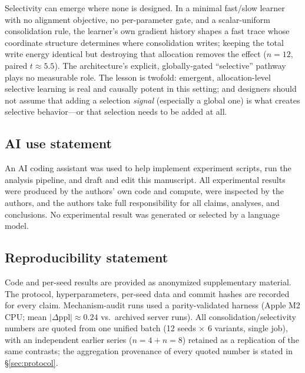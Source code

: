 \documentclass{article} %
\begin{document}
Selectivity can emerge where none is designed. In a minimal fast/slow learner with no alignment objective, no per-parameter gate, and a scalar-uniform consolidation rule, the learner's own gradient history shapes a fast trace whose coordinate structure determines where consolidation writes; keeping the total write energy identical but destroying that allocation removes the effect ($n{=}12$, paired $t\approx5.5$). The architecture's explicit, globally-gated ``selective'' pathway plays no measurable role. The lesson is twofold: emergent, allocation-level selective learning is real and causally potent in this setting; and designers should not assume that adding a selection \emph{signal} (especially a global one) is what creates selective behavior---or that selection needs to be added at all.

\subsection*{AI use statement}

An AI coding assistant was used to help implement experiment scripts, run the analysis pipeline, and draft and edit this manuscript. All experimental results were produced by the authors' own code and compute, were inspected by the authors, and the authors take full responsibility for all claims, analyses, and conclusions. No experimental result was generated or selected by a language model.

\subsection*{Reproducibility statement}

Code and per-seed results are provided as anonymized supplementary material. The protocol, hyperparameters, per-seed data and commit hashes are recorded for every claim. Mechanism-audit runs used a parity-validated harness (Apple M2 CPU; mean $|\Delta\mathrm{ppl}| \approx 0.24$ vs.\ archived server runs). All consolidation/selectivity numbers are quoted from one unified batch (12 seeds $\times$ 6 variants, single job), with an independent earlier series ($n{=}4+n{=}8$) retained as a replication of the same contrasts; the aggregation provenance of every quoted number is stated in \S\ref{sec:protocol}.



\end{document}
